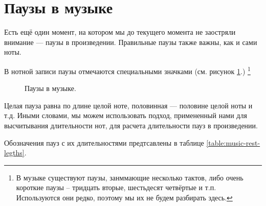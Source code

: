 \documentclass[a4paper,twoside]{book}
\begin{document}
\section{Паузы в музыке}

Есть ещё один момент, на котором мы до текущего момента не заостряли внимание ---
паузы в произведении. Правильные паузы также важны, как и сами ноты.

В нотной записи паузы отмечаются специальными значками (см. рисунок
\ref{fig:lilypond-rest-example-1}.) \footnote{В музыке существуют паузы,
занммающие несколько тактов, либо очень короткие паузы -- тридцать вторые,
шестьдесят четвёртые и т.п. Используются они редко, поэтому мы их не будем
разбирать здесь.}

\begin{figure}[ht]
  \caption{Паузы в музыке.}
  \centering
  \label{fig:lilypond-rest-example-1}
\end{figure}

Целая пауза равна по длине целой ноте, половинная --- половине целой ноты и т.д.
Иными словами, мы можем использовать подход, примененный нами для высчитывания
длительности нот, для расчета длительности пауз в произведении.

Обозначения пауз с их длительностями предтсавлены в таблице
\ref{table:music-rest-legths}.
\end{document}
